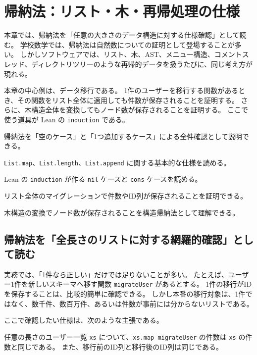 \chapter{帰納法：リスト・木・再帰処理の仕様}
\label{chap:induction}

\begin{chapterabstract}
本章では、帰納法を「任意の大きさのデータ構造に対する仕様確認」として読む。
学校数学では、帰納法は自然数についての証明として登場することが多い。
しかしソフトウェアでは、リスト、木、AST、メニュー構造、コメントスレッド、ディレクトリツリーのような再帰的データを扱うたびに、同じ考え方が現れる。

本章の中心例は、データ移行である。
1件のユーザーを移行する関数があるとき、その関数をリスト全体に適用しても件数が保存されることを証明する。
さらに、木構造全体を変換してもノード数が保存されることを証明する。
ここで使う道具が Lean の \texttt{induction} である。
\end{chapterabstract}

\begin{learninggoals}
\item 帰納法を「空のケース」と「1つ追加するケース」による全件確認として説明できる。
\item \texttt{List.map}、\texttt{List.length}、\texttt{List.append} に関する基本的な仕様を読める。
\item Lean の \texttt{induction} が作る \texttt{nil} ケースと \texttt{cons} ケースを読める。
\item リスト全体のマイグレーションで件数やID列が保存されることを証明できる。
\item 木構造の変換でノード数が保存されることを構造帰納法として理解できる。
\end{learninggoals}

\section{帰納法を「全長さのリストに対する網羅的確認」として読む}

実務では、「1件なら正しい」だけでは足りないことが多い。
たとえば、ユーザー1件を新しいスキーマへ移す関数 \texttt{migrateUser} があるとする。
1件の移行がIDを保存することは、比較的簡単に確認できる。
しかし本番の移行対象は、1件ではなく、数千件、数百万件、あるいは件数が事前には分からないリストである。

ここで確認したい仕様は、次のような主張である。

\begin{softwarebox}
任意の長さのユーザー一覧 \texttt{xs} について、\texttt{xs.map migrateUser} の件数は \texttt{xs} の件数と同じである。
また、移行前のID列と移行後のID列は同じである。
\end{softwarebox}

